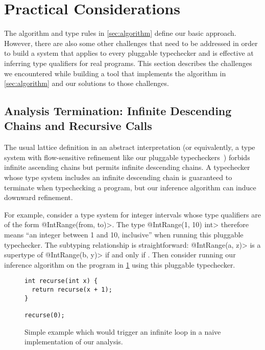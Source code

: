 \section{Practical Considerations}
\label{sec:difficulties}

The algorithm and type rules in \cref{sec:algorithm} define our
basic approach. However, there are also some other challenges
that need to be addressed in order to build a system that applies
to every pluggable typechecker and is effective at inferring
type qualifiers for real programs. This section describes the
challenges we encountered while building a tool that implements
the algorithm in \cref{sec:algorithm} and our solutions to those
challenges.

\subsection{Analysis Termination: Infinite Descending Chains and Recursive Calls}
\label{sec:infinite-descending-chains}

The usual lattice definition in an abstract interpretation
(or equivalently, a type system with flow-sensitive refinement like our
pluggable typecheckers~\cite{Cousot1997}) forbids
infinite ascending chains but permits infinite descending chains.
A typechecker whose type system includes an infinite descending chain
is guaranteed to terminate when typechecking a program, but our
inference algorithm can induce downward refinement.

For example, consider a type system for integer intervals
whose type qualifiers are of the form \<@Int\-Range(from, to)>.
The type \<@Int\-Range(1, 10) int> therefore means ``an integer between
1 and 10, inclusive'' when running this pluggable typechecker.
The subtyping relationship is straightforward: \<@Int\-Range(a, z)>
is a supertype of \<@Int\-Range(b, y)> if and only if .
Then consider running our inference algorithm on the program in \cref{fig:descend}
using this pluggable typechecker.

\begin{figure}
\begin{verbatim}
int recurse(int x) {
  return recurse(x + 1);
}

recurse(0);
\end{verbatim}
\caption{Simple example which would trigger an infinite loop in a naive
  implementation of our analysis.}
\label{fig:descend}
\end{figure}

